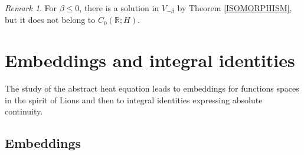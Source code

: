 \documentclass[11pt, letterpaper]{amsart}
\theoremstyle{definition}
\theoremstyle{remark}
\newtheorem{rem}[thm]{Remark}
\numberwithin{equation}{section}
\begin{document}
\begin{rem}
    For $\beta\le 0$, there is a solution in $V_{-\beta}$ by Theorem \ref{ISOMORPHISM}, but it does not belong to $C_0(\mathbb{R}; H)$.
\end{rem}

\section{Embeddings and integral identities}\label{Section 4}

The study of the abstract heat equation leads to embeddings for functions spaces in the spirit of Lions and then to integral identities expressing absolute continuity.

\subsection{Embeddings}
\end{document}
